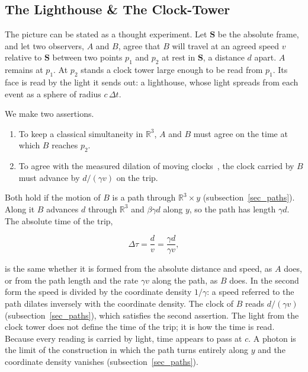 \documentclass{iopjournal}
\begin{document}
\subsection{The Lighthouse \& The Clock-Tower}\label{sec_lighthouse}

The picture can be stated as a thought experiment. Let $\mathbf{S}$ be the absolute frame, and let two observers, $A$ and $B$, agree that $B$ will travel at an agreed speed $v$ relative to $\mathbf{S}$ between two points $p_1$ and $p_2$ at rest in $\mathbf{S}$, a distance $d$ apart. $A$ remains at $p_1$. At $p_2$ stands a clock tower large enough to be read from $p_1$. Its face is read by the light it sends out: a lighthouse, whose light spreads from each event as a sphere of radius $c\,\Delta t$.

We make two assertions.

\begin{enumerate}[label=\arabic*.]
\item To keep a classical simultaneity in $\mathbb{R}^{3}$, $A$ and $B$ must agree on the time at which $B$ reaches $p_{2}$.
\item To agree with the measured dilation of moving clocks~\cite{Rossi1941, FrischSmith1963, Bailey1977, Bailey1979, Botermann2014}, the clock carried by $B$ must advance by $d/(\gamma v)$ on the trip.
\end{enumerate}

Both hold if the motion of $B$ is a path through $\mathbb{R}^3\times y$ (subsection~\ref{sec_paths}). Along it $B$ advances $d$ through $\mathbb{R}^3$ and $\beta\gamma d$ along $y$, so the path has length $\gamma d$. The absolute time of the trip,

\begin{equation}\label{eq_lighthouse_time}
    \Delta\tau=\frac{d}{v}=\frac{\gamma d}{\gamma v},
\end{equation}

is the same whether it is formed from the absolute distance and speed, as $A$ does, or from the path length and the rate $\gamma v$ along the path, as $B$ does. In the second form the speed is divided by the coordinate density $1/\gamma$: a speed referred to the path dilates inversely with the coordinate density. The clock of $B$ reads $d/(\gamma v)$ (subsection~\ref{sec_paths}), which satisfies the second assertion. The light from the clock tower does not define the time of the trip; it is how the time is read. Because every reading is carried by light, time appears to pass at $c$. A photon is the limit of the construction in which the path turns entirely along $y$ and the coordinate density vanishes (subsection~\ref{sec_paths}).
\end{document}
